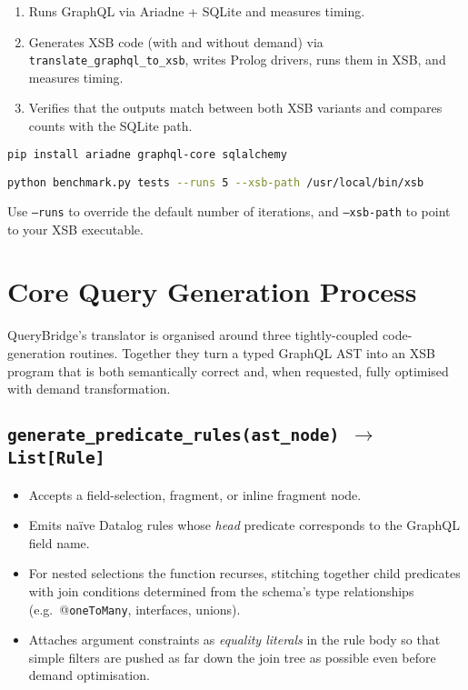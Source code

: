 \documentclass[11pt]{article}
\begin{document}
\begin{enumerate}
  \item Runs GraphQL via Ariadne + SQLite and measures timing.
  \item Generates XSB code (with and without demand) via \texttt{translate\_graphql\_to\_xsb}, writes Prolog drivers, runs them in XSB, and measures timing.
  \item Verifies that the outputs match between both XSB variants and compares counts with the SQLite path.
\end{enumerate}

\begin{lstlisting}[language=bash]
pip install ariadne graphql-core sqlalchemy

python benchmark.py tests --runs 5 --xsb-path /usr/local/bin/xsb
\end{lstlisting}

Use \texttt{--runs} to override the default number of iterations, and \texttt{--xsb-path} to point to your XSB executable.


\section{Core Query Generation Process}
\label{sec:codegen}

QueryBridge’s translator is organised around three tightly-coupled
code-generation routines.  Together they turn a typed GraphQL AST into an
XSB program that is both semantically correct and, when requested, fully
optimised with demand transformation.

\subsection{\texttt{generate\_predicate\_rules(ast\_node) $\rightarrow$ List\texttt{[}Rule\texttt{]}}}
\begin{itemize}[leftmargin=1.5em]
  \item Accepts a field-selection, fragment, or inline fragment node.
  \item Emits naïve Datalog rules whose \emph{head} predicate corresponds
        to the GraphQL field name.  
  \item For nested selections the function recurses, stitching together
        child predicates with join conditions determined from the schema’s
        type relationships (e.g.\ @\texttt{oneToMany}, interfaces,
        unions).
  \item Attaches argument constraints as \emph{equality literals} in the
        rule body so that simple filters are pushed as far down the join
        tree as possible even before demand optimisation.
\end{itemize}
\end{document}
